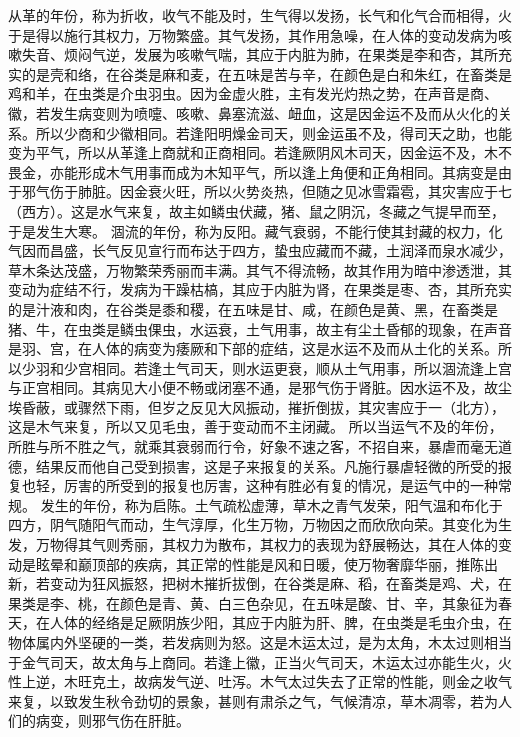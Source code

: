 \documentclass[a4paper,12pt,UTF8,twoside]{ctexbook}
\begin{document}
从革的年份，称为折收，收气不能及时，生气得以发扬，长气和化气合而相得，火于是得以施行其权力，万物繁盛。其气发扬，其作用急噪，在人体的变动发病为咳嗽失音、烦闷气逆，发展为咳嗽气喘，其应于内脏为肺，在果类是李和杏，其所充实的是壳和络，在谷类是麻和麦，在五味是苦与辛，在颜色是白和朱红，在畜类是鸡和羊，在虫类是介虫羽虫。因为金虚火胜，主有发光灼热之势，在声音是商、徽，若发生病变则为喷嚏、咳嗽、鼻塞流滋、衄血，这是因金运不及而从火化的关系。所以少商和少徽相同。若逢阳明燥金司天，则金运虽不及，得司天之助，也能变为平气，所以从革逢上商就和正商相同。若逢厥阴风木司天，因金运不及，木不畏金，亦能形成木气用事而成为木知平气，所以逢上角便和正角相同。其病变是由于邪气伤于肺脏。因金衰火旺，所以火势炎热，但随之见冰雪霜雹，其灾害应于七（西方）。这是水气来复，故主如鳞虫伏藏，猪、鼠之阴沉，冬藏之气提早而至，于是发生大寒。
涸流的年份，称为反阳。藏气衰弱，不能行使其封藏的权力，化气因而昌盛，长气反见宣行而布达于四方，蛰虫应藏而不藏，土润泽而泉水减少，草木条达茂盛，万物繁荣秀丽而丰满。其气不得流畅，故其作用为暗中渗透泄，其变动为症结不行，发病为干躁枯槁，其应于内脏为肾，在果类是枣、杏，其所充实的是汁液和肉，在谷类是黍和稷，在五味是甘、咸，在颜色是黄、黑，在畜类是猪、牛，在虫类是鳞虫倮虫，水运衰，土气用事，故主有尘土昏郁的现象，在声音是羽、宫，在人体的病变为痿厥和下部的症结，这是水运不及而从土化的关系。所以少羽和少宫相同。若逢土气司天，则水运更衰，顺从土气用事，所以涸流逢上宫与正宫相同。其病见大小便不畅或闭塞不通，是邪气伤于肾脏。因水运不及，故尘埃昏蔽，或骤然下雨，但岁之反见大风振动，摧折倒拔，其灾害应于一（北方），这是木气来复，所以又见毛虫，善于变动而不主闭藏。
所以当运气不及的年份，所胜与所不胜之气，就乘其衰弱而行令，好象不速之客，不招自来，暴虐而毫无道德，结果反而他自己受到损害，这是子来报复的关系。凡施行暴虐轻微的所受的报复也轻，厉害的所受到的报复也厉害，这种有胜必有复的情况，是运气中的一种常规。
发生的年份，称为启陈。土气疏松虚薄，草木之青气发荣，阳气温和布化于四方，阴气随阳气而动，生气淳厚，化生万物，万物因之而欣欣向荣。其变化为生发，万物得其气则秀丽，其权力为散布，其权力的表现为舒展畅达，其在人体的变动是眩晕和巅顶部的疾病，其正常的性能是风和日暖，使万物奢靡华丽，推陈出新，若变动为狂风振怒，把树木摧折拔倒，在谷类是麻、稻，在畜类是鸡、犬，在果类是李、桃，在颜色是青、黄、白三色杂见，在五味是酸、甘、辛，其象征为春天，在人体的经络是足厥阴族少阳，其应于内脏为肝、脾，在虫类是毛虫介虫，在物体属内外坚硬的一类，若发病则为怒。这是木运太过，是为太角，木太过则相当于金气司天，故太角与上商同。若逢上徽，正当火气司天，木运太过亦能生火，火性上逆，木旺克土，故病发气逆、吐泻。木气太过失去了正常的性能，则金之收气来复，以致发生秋令劲切的景象，甚则有肃杀之气，气候清凉，草木凋零，若为人们的病变，则邪气伤在肝脏。
\end{document}
